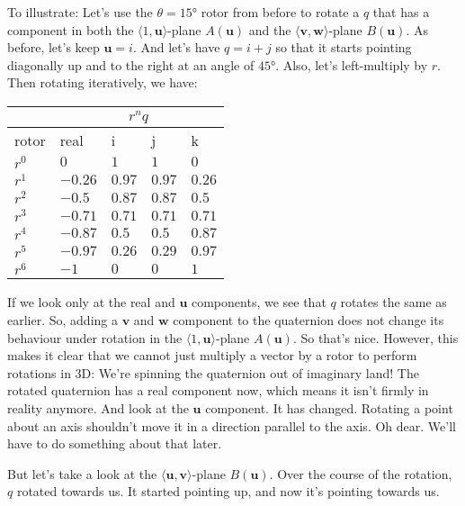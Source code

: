 \documentclass[12pt]{article}
\begin{document}
	 	To illustrate: Let's use the $\theta = 15\si{\degree}$ rotor from before to rotate a $q$ that has a component in both the $\langle 1, \mathbf{u} \rangle$-plane $A(\mathbf{u})$ and the $\langle \mathbf{v}, \mathbf{w} \rangle$-plane $B(\mathbf{u})$. 
	 	As before, let's keep $\mathbf{u} = i$. 
	 	And let's have $q = i + j$ so that it starts pointing diagonally up and to the right at an angle of $45\si{\degree}$.
	 	Also, let's left-multiply by $r$. 
	 	Then rotating iteratively, we have: 

	\begin{tabular}{|p{1cm} | p{1.1cm} | p{1.1cm} | p{1.1cm} | p{1.1cm}|}
		\hline
		 &  \multicolumn{4}{c}{$r^n q$} \\ 
 		\hline
 		rotor & real & i & j & k\\
 		\hline
 		$r^0$ & $0    $ & $1   $ & $1   $ & $0   $\\ \hline
		$r^1$ & $-0.26$ & $0.97$ & $0.97$ & $0.26$\\ \hline
		$r^2$ & $-0.5 $ & $0.87$ & $0.87$ & $0.5 $\\ \hline
		$r^3$ & $-0.71$ & $0.71$ & $0.71$ & $0.71$\\ \hline
		$r^4$ & $-0.87$ & $0.5 $ & $0.5 $ & $0.87$\\ \hline
		$r^5$ & $-0.97$ & $0.26$ & $0.29$ & $0.97$\\ \hline
		$r^6$ & $-1   $ & $0   $ & $0   $ & $1   $\\ \hline
	\end{tabular}
	 
	If we look only at the real and $\mathbf{u}$ components, we see that $q$ rotates the same as earlier.
	So, adding a $\mathbf{v}$ and $\mathbf{w}$ component to the quaternion does not change its behaviour under rotation in the $\langle 1, \mathbf{u} \rangle$-plane $A(\mathbf{u})$.
	So that's nice.
	However, this makes it clear that we cannot just multiply a vector by a rotor to perform rotations in 3D:
 	We're spinning the quaternion out of imaginary land! 
 	The rotated quaternion has a real component now, which means it isn't firmly in reality anymore. 
 	And look at the $\mathbf{u}$ component. 
 	It has changed. 
 	Rotating a point about an axis shouldn't move it in a direction parallel to the axis. 
 	Oh dear. 
 	We'll have to do something about that later.
 	
 	But let's take a look at the $\langle \mathbf{u}, \mathbf{v} \rangle$-plane $B(\mathbf{u})$. 
 	Over the course of the rotation, $q$ rotated towards us. 
 	It started pointing up, and now it's pointing towards us. 
 	
\end{document}
